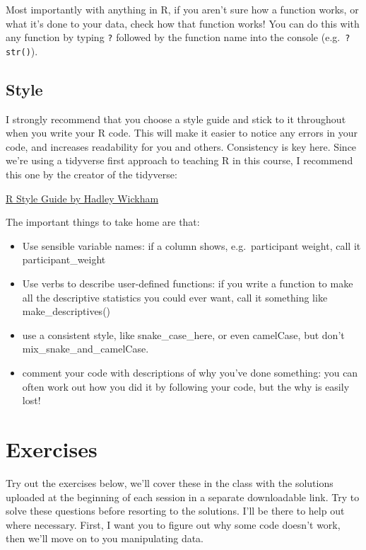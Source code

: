 \documentclass[
]{book}
\providecommand{\tightlist}{%
  \setlength{\itemsep}{0pt}\setlength{\parskip}{0pt}}
\begin{document}
Most importantly with anything in R, if you aren't sure how a function works, or what it's done to your data, check how that function works! You can do this with any function by typing \texttt{?} followed by the function name into the console (e.g.~\texttt{?str()}).

\hypertarget{style}{%
\subsection{Style}\label{style}}

I strongly recommend that you choose a style guide and stick to it throughout when you write your R code. This will make it easier to notice any errors in your code, and increases readability for you and others. Consistency is key here. Since we're using a tidyverse first approach to teaching R in this course, I recommend this one by the creator of the tidyverse:

\href{http://adv-r.had.co.nz/Style.html}{R Style Guide by Hadley Wickham}

The important things to take home are that:

\begin{itemize}
\tightlist
\item
  Use sensible variable names: if a column shows, e.g.~participant weight, call it participant\_weight
\item
  Use verbs to describe user-defined functions: if you write a function to make all the descriptive statistics you could ever want, call it something like make\_descriptives()
\item
  use a consistent style, like snake\_case\_here, or even camelCase, but don't mix\_snake\_and\_camelCase.
\item
  comment your code with descriptions of why you've done something: you can often work out how you did it by following your code, but the why is easily lost!
\end{itemize}

\hypertarget{exercises}{%
\section{Exercises}\label{exercises}}

Try out the exercises below, we'll cover these in the class with the solutions uploaded at the beginning of each session in a separate downloadable link. Try to solve these questions before resorting to the solutions. I'll be there to help out where necessary. First, I want you to figure out why some code doesn't work, then we'll move on to you manipulating data.
\end{document}
